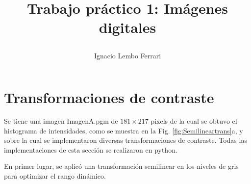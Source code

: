 \documentclass[11pt,twocolumn,twoside]{opticajnl}
\title{
\vspace{0.1cm} 

Trabajo práctico 1: Imágenes digitales}
\author[1]{\huge{Ignacio Lembo Ferrari}}
\affil[1]{\large{ignaciolembo@ib.edu.ar} 

\vspace{0.1cm}

{\datesfont 1 de marzo del 2024.}

\vspace{0.1cm}
}
\begin{document}
\maketitle

\section{Transformaciones de contraste\label{sec:ej1ej2}}

\vspace{0.3cm}

Se tiene una imagen ImagenA.pgm de $181\times217$ pixels de la cual se obtuvo el histograma de intensidades, como se muestra en la Fig. \ref{fig:Semilineartrans}a, y sobre la cual se implementaron diversas transformaciones de contraste. Todas las implementaciones de esta sección se realizaron en python.

En primer lugar, se aplicó una transformación semilinear en los niveles de gris para optimizar el rango dinámico. 
\end{document}
